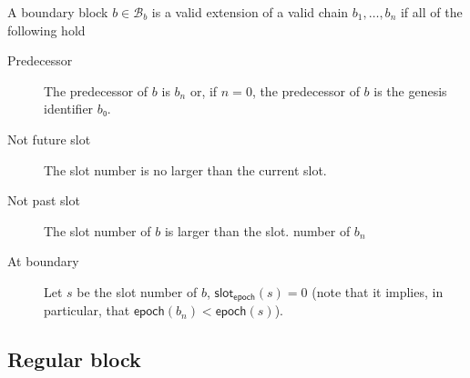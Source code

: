 \documentclass{article}
\newcommand{\bblocks}{\mathcal{B}_b}
\newcommand{\epoch}[1]{\mathsf{epoch}(#1)}
\newcommand{\epochslot}[1]{\mathsf{slot}_\mathsf{epoch}(#1)}
\begin{document}
A boundary block $b∈\bblocks$ is a valid extension of a valid chain
$b_1,…,b_n$ if all of the following hold
\begin{description}
\item[Predecessor] The predecessor of $b$ is $b_n$ or, if $n=0$, the predecessor
  of $b$ is the genesis identifier $b₀$.
\item[Not future slot] The slot number is no larger than the current
  slot.
\item[Not past slot] The slot number of $b$ is larger than the slot.
  number of $b_n$
\item[At boundary] Let $s$ be the slot number of $b$, $\epochslot{s} =
  0$ (note that it implies, in particular, that $\epoch{b_n}<\epoch{s}$).
\end{description}

\subsection{Regular block}
\label{sec:regular-blocks}
\end{document}
